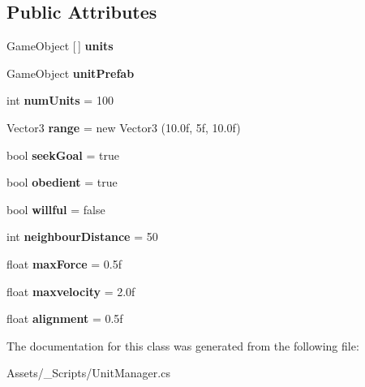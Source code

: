 \subsection*{Public Attributes}
\begin{DoxyCompactItemize}
\item 
\mbox{\label{class_unit_manager_ae3b00f134786d65f4d2596b5dea72b27}} 
Game\+Object \mbox{[}$\,$\mbox{]} {\bfseries units}
\item 
\mbox{\label{class_unit_manager_ae9ce302388b9ca7614bda98ae6771a32}} 
Game\+Object {\bfseries unit\+Prefab}
\item 
\mbox{\label{class_unit_manager_a903b6a94b80a74492b0fa09b87f85cbf}} 
int {\bfseries num\+Units} = 100
\item 
\mbox{\label{class_unit_manager_a9a4c1f152ee3731c67475a4dc0bf88fc}} 
Vector3 {\bfseries range} = new Vector3 (10.\+0f, 5f, 10.\+0f)
\item 
\mbox{\label{class_unit_manager_af71ea57608f99a8011ef4861ce35bd5f}} 
bool {\bfseries seek\+Goal} = true
\item 
\mbox{\label{class_unit_manager_a47231b058515f2e03f40adfa7be1d8f2}} 
bool {\bfseries obedient} = true
\item 
\mbox{\label{class_unit_manager_a3e6616b3089da5dfc42d472025a4cc88}} 
bool {\bfseries willful} = false
\item 
\mbox{\label{class_unit_manager_aa888e707617707fc3d4754bf8bfb4732}} 
int {\bfseries neighbour\+Distance} = 50
\item 
\mbox{\label{class_unit_manager_abfc2eb72073d21b463119c3baf317e50}} 
float {\bfseries max\+Force} = 0.\+5f
\item 
\mbox{\label{class_unit_manager_af2bf30735657c5644286491665feaabb}} 
float {\bfseries maxvelocity} = 2.\+0f
\item 
\mbox{\label{class_unit_manager_a12c55a004abe173415b84e29a28a9997}} 
float {\bfseries alignment} = 0.\+5f
\end{DoxyCompactItemize}


The documentation for this class was generated from the following file\+:\begin{DoxyCompactItemize}
\item 
Assets/\+\_\+\+Scripts/Unit\+Manager.\+cs\end{DoxyCompactItemize}

